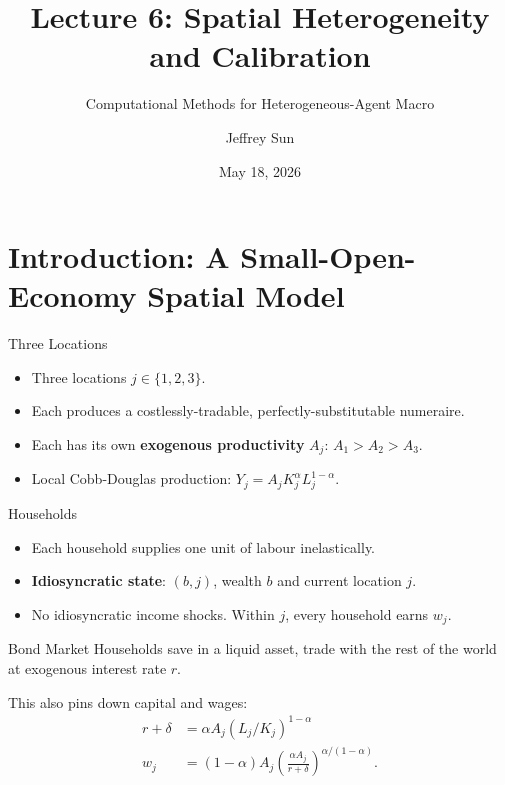 \documentclass[10pt,aspectratio=169]{beamer}
\title{Lecture 6: Spatial Heterogeneity and Calibration}
\subtitle{Computational Methods for Heterogeneous-Agent Macro}
\author{Jeffrey Sun}
\institute{University of Toronto}
\date{May 18, 2026}
\begin{document}
\maketitle

\section[Introduction]{Introduction: A Small-Open-Economy Spatial Model}

\begin{frame}{Three Locations}
  \begin{itemize}
    \item Three locations $j\in\{1,2,3\}$.
    \item Each produces a costlessly-tradable, perfectly-substitutable numeraire.
    \item Each has its own \textbf{exogenous productivity} $A_j$: $A_1 > A_2 > A_3$.
    \item Local Cobb-Douglas production: $Y_j = A_j K_j^{\alpha} L_j^{1-\alpha}$.
  \end{itemize}
\end{frame}

\begin{frame}{Households}
  \begin{itemize}
    \item Each household supplies one unit of labour inelastically.
    \item \textbf{Idiosyncratic state}: $(b, j)$, wealth $b$ and current location $j$.
    \item No idiosyncratic income shocks. Within $j$, every household earns $w_j$.
  \end{itemize}
\end{frame}

\begin{frame}{Bond Market}
  Households save in a liquid asset, trade with the rest of the world at exogenous interest rate $r$.

  This also pins down capital and wages:
  \begin{align*}
    r + \delta &= \alpha A_j (L_j / K_j)^{1 - \alpha}\\
    w_j &= (1 - \alpha) A_j \left( \frac{\alpha A_j}{r + \delta} \right)^{\alpha / (1 - \alpha)}.
  \end{align*}
\end{frame}
\end{document}
